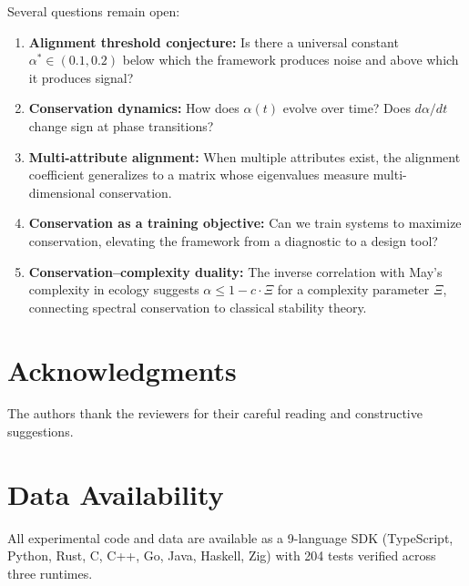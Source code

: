 \documentclass[12pt,letterpaper]{article}
\begin{document}
Several questions remain open:
\begin{enumerate}
  \item \textbf{Alignment threshold conjecture:} Is there a universal constant $\alpha^* \in (0.1, 0.2)$ below which the framework produces noise and above which it produces signal?
  \item \textbf{Conservation dynamics:} How does $\alpha(t)$ evolve over time? Does $d\alpha/dt$ change sign at phase transitions?
  \item \textbf{Multi-attribute alignment:} When multiple attributes exist, the alignment coefficient generalizes to a matrix whose eigenvalues measure multi-dimensional conservation.
  \item \textbf{Conservation as a training objective:} Can we train systems to maximize conservation, elevating the framework from a diagnostic to a design tool?
  \item \textbf{Conservation--complexity duality:} The inverse correlation with May's complexity in ecology suggests $\alpha \leq 1 - c \cdot \Xi$ for a complexity parameter $\Xi$, connecting spectral conservation to classical stability theory.
\end{enumerate}

\section*{Acknowledgments}

The authors thank the reviewers for their careful reading and constructive suggestions.

\section*{Data Availability}

All experimental code and data are available as a 9-language SDK (TypeScript, Python, Rust, C, C++, Go, Java, Haskell, Zig) with 204 tests verified across three runtimes.
\end{document}
